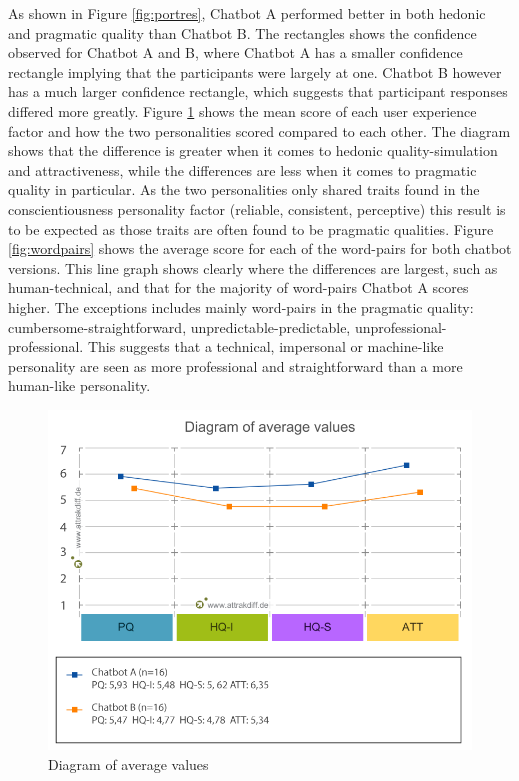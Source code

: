 As shown in Figure \ref{fig:portres}, Chatbot A performed better in both hedonic and pragmatic quality than Chatbot B. The rectangles shows the confidence observed for Chatbot A and B, where Chatbot A has a smaller confidence rectangle implying that the participants were largely at one. Chatbot B however has a much larger confidence rectangle, which suggests that participant responses differed more greatly. Figure \ref{fig:diagval} shows the mean score of each user experience factor and how the two personalities scored compared to each other. The diagram shows that the difference is greater when it comes to hedonic quality-simulation and attractiveness, while the differences are less when it comes to pragmatic quality in particular. As the two personalities only shared traits found in the conscientiousness personality factor (reliable, consistent, perceptive) this result is to be expected as those traits are often found to be pragmatic qualities. Figure \ref{fig:wordpairs} shows the average score for each of the word-pairs for both chatbot versions. This line graph shows clearly where the differences are largest, such as human-technical, and that for the majority of word-pairs Chatbot A scores higher. The exceptions includes mainly word-pairs in the pragmatic quality: cumbersome-straightforward, unpredictable-predictable, unprofessional-professional. This suggests that a technical, impersonal or machine-like personality are seen as more professional and straightforward than a more human-like personality.

\begin{figure}[h]
    \centering
    \includegraphics[scale=0.5]{figures/Diagram-of-average-values.png}
    \caption{Diagram of average values}
    \label{fig:diagval}
\end{figure}

